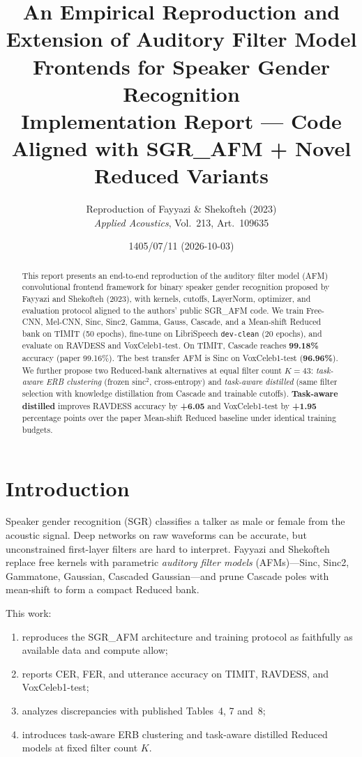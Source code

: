 \documentclass[11pt,a4paper]{article}
\title{
\vspace{-1.2em}
\textbf{An Empirical Reproduction and Extension of Auditory Filter Model Frontends for Speaker Gender Recognition}\\[0.6em]
\large Implementation Report --- Code Aligned with SGR\_AFM + Novel Reduced Variants
}
\author{
  Reproduction of Fayyazi \& Shekofteh (2023)\\[0.3em]
  \normalsize\textit{Applied Acoustics}, Vol.~213, Art.~109635
}
\date{1405/07/11 (2026-10-03)}
\begin{document}
\maketitle

\begin{abstract}
\noindent
This report presents an end-to-end reproduction of the auditory filter model (AFM) convolutional frontend framework for binary speaker gender recognition proposed by Fayyazi and Shekofteh (2023), with kernels, cutoffs, LayerNorm, optimizer, and evaluation protocol aligned to the authors' public SGR\_AFM code. We train Free-CNN, Mel-CNN, Sinc, Sinc2, Gamma, Gauss, Cascade, and a Mean-shift Reduced bank on TIMIT (50 epochs), fine-tune on LibriSpeech \texttt{dev-clean} (20 epochs), and evaluate on RAVDESS and VoxCeleb1-test. On TIMIT, Cascade reaches \textbf{99.18\%} accuracy (paper 99.16\%). The best transfer AFM is Sinc on VoxCeleb1-test (\textbf{96.96\%}). We further propose two Reduced-bank alternatives at equal filter count $K{=}43$: \emph{task-aware ERB clustering} (frozen sinc$^2$, cross-entropy) and \emph{task-aware distilled} (same filter selection with knowledge distillation from Cascade and trainable cutoffs). \textbf{Task-aware distilled} improves RAVDESS accuracy by \textbf{+6.05} and VoxCeleb1-test by \textbf{+1.95} percentage points over the paper Mean-shift Reduced baseline under identical training budgets.
\end{abstract}

\tableofcontents
\newpage

\section{Introduction}

Speaker gender recognition (SGR) classifies a talker as male or female from the acoustic signal. Deep networks on raw waveforms can be accurate, but unconstrained first-layer filters are hard to interpret. Fayyazi and Shekofteh~\cite{fayyazi2023} replace free kernels with parametric \emph{auditory filter models} (AFMs)---Sinc, Sinc2, Gammatone, Gaussian, Cascaded Gaussian---and prune Cascade poles with mean-shift to form a compact Reduced bank.

This work:
\begin{enumerate}[leftmargin=1.6em,itemsep=0.25em]
  \item reproduces the SGR\_AFM architecture and training protocol as faithfully as available data and compute allow;
  \item reports CER, FER, and utterance accuracy on TIMIT, RAVDESS, and VoxCeleb1-test;
  \item analyzes discrepancies with published Tables~4, 7 and~8;
  \item introduces task-aware ERB clustering and task-aware distilled Reduced models at fixed filter count $K$.
\end{enumerate}
\end{document}
